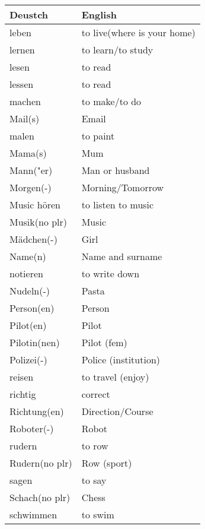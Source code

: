 \documentclass{article}
\renewcommand{\arraystretch}{1}
\begin{document}
\begin{minipage}{0.48\textwidth}
    \centering
    \renewcommand{\arraystretch}{1.5}
    \begin{tabular}{|>{\raggedright\arraybackslash}p{3.5cm}|>{\raggedright\arraybackslash}p{3.5cm}|}
        \hline
        \rowcolor{gray!20} \textbf{Deustch} & \textbf{English} \\
        \hline
        leben & to live(where is your home) \\\hline
        lernen & to learn/to study \\\hline
        lesen & to read \\\hline
        lessen & to read \\\hline
        machen & to make/to do \\\hline
        Mail(s) & Email \\\hline
        malen & to paint \\\hline
        Mama(s) & Mum \\\hline
        Mann("er) & Man or husband \\\hline
        Morgen(-) & Morning/Tomorrow \\\hline
        Music hören & to listen to music \\\hline
        Musik(no plr) & Music \\\hline
        Mädchen(-) & Girl \\\hline
        Name(n) & Name and surname \\\hline
        notieren & to write down \\\hline
        Nudeln(-) & Pasta \\\hline
        Person(en) & Person \\\hline
        Pilot(en) & Pilot \\\hline
        Pilotin(nen) & Pilot (fem) \\\hline
        Polizei(-) & Police (institution) \\\hline
        reisen & to travel (enjoy) \\\hline
        richtig & correct \\\hline
        Richtung(en) & Direction/Course \\\hline
        Roboter(-) & Robot \\\hline
        rudern & to row \\\hline
        Rudern(no plr) & Row (sport) \\\hline
        sagen & to say \\\hline
        Schach(no plr) & Chess \\\hline
        schwimmen & to swim \\\hline
    \end{tabular}
\end{minipage}%
\end{document}
